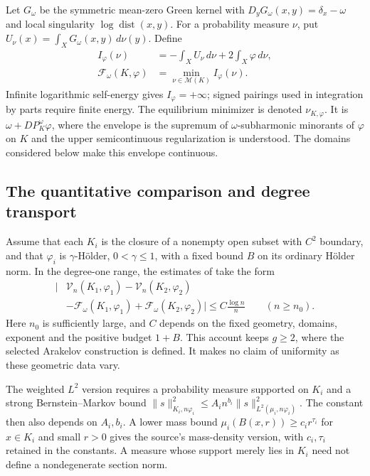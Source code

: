 Let $G_\omega$ be the symmetric mean-zero Green kernel with
$D_yG_\omega(x,y)=\delta_x-\omega$ and local singularity
$\log\operatorname{dist}(x,y)$. For a probability measure $\nu$,
put $U_\nu(x)=\int_XG_\omega(x,y)\,d\nu(y)$. Define
\[
 \begin{split}
 I_\varphi(\nu)&=-\int_XU_\nu\,d\nu
                      +2\int_X\varphi\,d\nu,\\
 \mathcal F_\omega(K,\varphi)&=\min_{\nu\in\mathcal M(K)}
                                    I_\varphi(\nu).
 \end{split}
 \tag{H.148}\label{eq:appH-curve-equilibrium-functional}
\]
Infinite logarithmic self-energy gives $I_\varphi=+\infty$;
signed pairings used in integration by parts require finite energy.
The equilibrium minimizer is denoted $\nu_{K,\varphi}$. It is
$\omega+DP_K^\omega\varphi$, where the envelope is the supremum
of $\omega$-subharmonic minorants of $\varphi$ on $K$ and the
upper semicontinuous regularization is understood. The domains
considered below make this envelope continuous.

\subsection{The quantitative comparison and degree transport}

Assume that each $K_i$ is the closure of a nonempty open subset
with $C^2$ boundary, and that $\varphi_i$ is $\gamma$-H\"older,
$0<\gamma\leq1$, with a fixed bound $B$ on its ordinary
H\"older norm. In the degree-one range, the estimates of
\cite[Theorems~1.1--1.3]{Wu26SectionBallRatesV1} take the form
\[
 \begin{aligned}
 \bigl|&\mathcal V_n(K_1,\varphi_1)-\mathcal V_n(K_2,\varphi_2)\\
       &-\mathcal F_\omega(K_1,\varphi_1)
       +\mathcal F_\omega(K_2,\varphi_2)\bigr|
       \leq C\frac{\log n}{n}\qquad(n\geq n_0).
 \end{aligned}
 \tag{H.149}\label{eq:appH-curve-volume-rate}
\]
Here $n_0$ is sufficiently large, and $C$ depends on the fixed
geometry, domains, exponent and the positive budget $1+B$.
This account keeps $g\geq2$, where the selected Arakelov
construction is defined. It makes no claim of uniformity as
these geometric data vary.

The weighted $L^2$ version requires a probability measure
supported on $K_i$ and a strong Bernstein--Markov bound
$\|s\|_{K_i,n\varphi_i}^2\leq A_i n^{b_i}
\|s\|_{L^2(\mu_i,n\varphi_i)}^2$. The constant then also
depends on $A_i,b_i$. A lower mass bound
$\mu_i(B(x,r))\geq c_i r^{\tau_i}$ for $x\in K_i$ and small
$r>0$ gives the source's mass-density version, with $c_i,
\tau_i$ retained in the constants. A measure whose support
merely lies in $K_i$ need not define a nondegenerate section norm.

